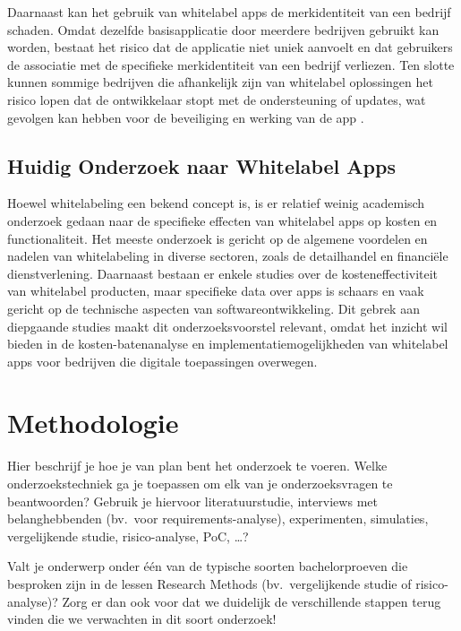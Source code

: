 Daarnaast kan het gebruik van whitelabel apps de merkidentiteit van een bedrijf schaden. 
Omdat dezelfde basisapplicatie door meerdere bedrijven gebruikt kan worden, bestaat het risico dat de applicatie niet uniek aanvoelt en dat gebruikers de associatie met de specifieke merkidentiteit van een bedrijf verliezen. 
Ten slotte kunnen sommige bedrijven die afhankelijk zijn van whitelabel oplossingen het risico lopen dat de ontwikkelaar stopt met de ondersteuning of updates, wat gevolgen kan hebben voor de beveiliging en werking van de app \autocite{Vendesta2023}.

\subsection{Huidig Onderzoek naar Whitelabel Apps}
Hoewel whitelabeling een bekend concept is, is er relatief weinig academisch onderzoek gedaan naar de specifieke effecten van whitelabel apps op kosten en functionaliteit. 
Het meeste onderzoek is gericht op de algemene voordelen en nadelen van whitelabeling in diverse sectoren, zoals de detailhandel en financiële dienstverlening. 
Daarnaast bestaan er enkele studies over de kosteneffectiviteit van whitelabel producten, maar specifieke data over apps is schaars en vaak gericht op de technische aspecten van softwareontwikkeling. 
Dit gebrek aan diepgaande studies maakt dit onderzoeksvoorstel relevant, omdat het inzicht wil bieden in de kosten-batenanalyse en implementatiemogelijkheden van whitelabel apps voor bedrijven die digitale toepassingen overwegen.
\section{Methodologie}%
\label{sec:methodologie}

Hier beschrijf je hoe je van plan bent het onderzoek te voeren. Welke onderzoekstechniek ga je toepassen om elk van je onderzoeksvragen te beantwoorden? Gebruik je hiervoor literatuurstudie, interviews met belanghebbenden (bv.~voor requirements-analyse), experimenten, simulaties, vergelijkende studie, risico-analyse, PoC, \ldots?

Valt je onderwerp onder één van de typische soorten bachelorproeven die besproken zijn in de lessen Research Methods (bv.\ vergelijkende studie of risico-analyse)? Zorg er dan ook voor dat we duidelijk de verschillende stappen terug vinden die we verwachten in dit soort onderzoek!

